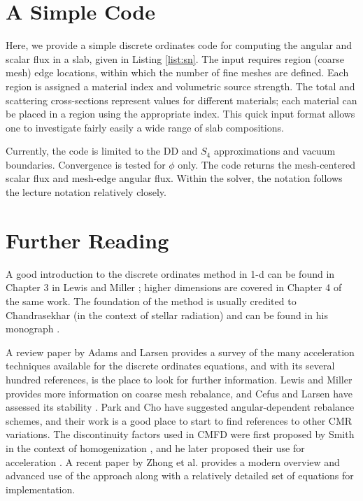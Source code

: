 \section*{A Simple Code}

Here, we provide a simple discrete ordinates code for computing the angular and scalar flux in a slab, given in Listing \ref{list:sn}.  The input requires region (coarse mesh) edge locations, within which the number of fine meshes are defined.  Each region is assigned a material index and volumetric source strength.  The total and scattering cross-sections represent values for different materials; each material can be placed in a region using the appropriate index.  This quick input format allows one to investigate fairly easily a wide range of slab compositions.

Currently, the code is limited to the DD and $S_4$ approximations and vacuum boundaries.  Convergence is tested for $\phi$ only.  The code returns the mesh-centered scalar flux and mesh-edge angular flux.  Within the solver, the notation follows the lecture notation relatively closely.



\section*{Further Reading}

A good introduction to the discrete ordinates method in 1-d can be found in Chapter 3 in Lewis and Miller \cite{lewis1993cmn}; higher dimensions are covered in Chapter 4 of the same work.  The foundation of the method is usually credited to Chandrasekhar (in the context of stellar radiation) and can be found in his monograph \cite{chandrasekhar1950rt}.  

A review paper by Adams and Larsen \cite{adams2002fim} provides a survey of the many acceleration techniques available for the discrete ordinates equations, and with its several hundred references, is the place to look for further information.  Lewis and Miller provides more information on coarse mesh rebalance, and Cefus and Larsen have assessed its stability \cite{cefus1990sac}.  Park and Cho \cite{park2004cma} have suggested angular-dependent rebalance schemes, and their work is a good place to start to find references to other CMR variations.  The discontinuity factors used in CMFD were first proposed by Smith in the context of homogenization \cite{smith1980shm}, and he later proposed their use for acceleration \cite{smith1983nms}. A recent paper by Zhong et al. \cite{zhong2008itl} provides a modern overview and advanced use of the approach along with a relatively detailed set of equations for implementation.  

